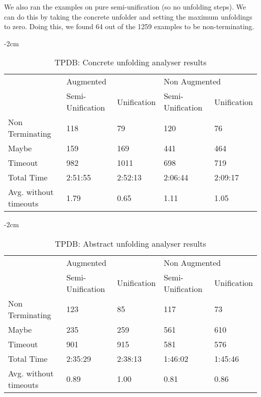 We also ran the examples on pure semi-unification (so no unfolding steps). We can do this by taking the concrete unfolder and setting the maximum unfoldings to zero. Doing this, we found 64 out of the 1259 examples to be non-terminating. 
\begin{table}[ht]
    \centering
    \addtolength{\leftskip} {-2cm}
    \addtolength{\rightskip}{-2cm}

    \begin{tabular}{|l|l|l|l|l|}
    \cline{2-5} 
    \multicolumn{1}{c|}{} & \multicolumn{2}{l|}{Augmented} & \multicolumn{2}{l|}{Non Augmented} \\ \cline{2-5} 
    \multicolumn{1}{c|}{} & Semi-Unification & Unification & Semi-Unification & Unification \\ \hline
    Non Terminating & 118 & 79 & 120 & 76 \\ \hline
    Maybe & 159 & 169 & 441 & 464\\ \hline
    Timeout & 982 & 1011 & 698 & 719 \\ \hline
    Total Time & 2:51:55 & 2:52:13 & 2:06:44 & 2:09:17 \\ \hline
    Avg. without timeouts & 1.79 & 0.65 & 1.11 & 1.05 \\ \hline
    \end{tabular}
    \caption{TPDB: Concrete unfolding analyser results}
\label{tab:result:concrete}

\end{table}
\begin{table}[ht]
    \centering
    \addtolength{\leftskip} {-2cm}
    \addtolength{\rightskip}{-2cm}

    \begin{tabular}{|l|l|l|l|l|}
    \cline{2-5} 
    \multicolumn{1}{c|}{} & \multicolumn{2}{l|}{Augmented} & \multicolumn{2}{l|}{Non Augmented} \\ \cline{2-5} 
    \multicolumn{1}{c|}{} & Semi-Unification & Unification & Semi-Unification & Unification \\ \hline
    Non Terminating & 123 & 85 & 117 & 73 \\ \hline
    Maybe & 235 & 259 & 561 & 610 \\ \hline
    Timeout & 901 & 915 & 581 & 576 \\ \hline
    Total Time & 2:35:29 & 2:38:13 & 1:46:02 & 1:45:46 \\ \hline
    Avg. without timeouts & 0.89 & 1.00 & 0.81 & 0.86 \\ \hline
    \end{tabular}
    \caption{TPDB: Abstract unfolding analyser results}
    \label{tab:result:abstract}
\end{table}

